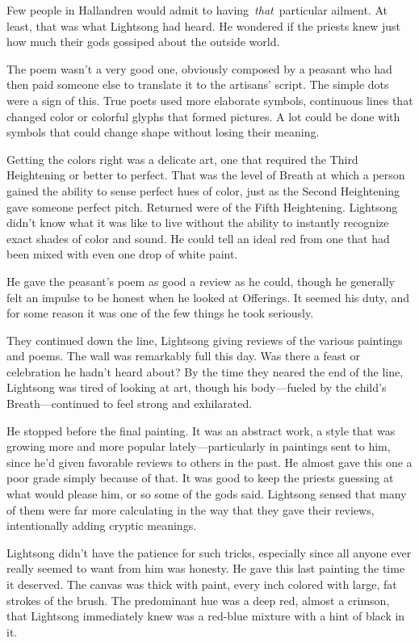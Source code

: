 Few people in Hallandren would admit to having~\textit{that}~particular ailment. At least, that was what Lightsong had heard. He wondered if the priests knew just how much their gods gossiped about the outside world.

The poem wasn’t a very good one, obviously composed by a peasant who had then paid someone else to translate it to the artisans’ script. The simple dots were a sign of this. True poets used more elaborate symbols, continuous lines that changed color or colorful glyphs that formed pictures. A lot could be done with symbols that could change shape without losing their meaning.

Getting the colors right was a delicate art, one that required the Third Heightening or better to perfect. That was the level of Breath at which a person gained the ability to sense perfect hues of color, just as the Second Heightening gave someone perfect pitch. Returned were of the Fifth Heightening. Lightsong didn’t know what it was like to live without the ability to instantly recognize exact shades of color and sound. He could tell an ideal red from one that had been mixed with even one drop of white paint.

He gave the peasant’s poem as good a review as he could, though he generally felt an impulse to be honest when he looked at Offerings. It seemed his duty, and for some reason it was one of the few things he took seriously.

They continued down the line, Lightsong giving reviews of the various paintings and poems. The wall was remarkably full this day. Was there a feast or celebration he hadn’t heard about? By the time they neared the end of the line, Lightsong was tired of looking at art, though his body—fueled by the child’s Breath—continued to feel strong and exhilarated.

He stopped before the final painting. It was an abstract work, a style that was growing more and more popular lately—particularly in paintings sent to him, since he’d given favorable reviews to others in the past. He almost gave this one a poor grade simply because of that. It was good to keep the priests guessing at what would please him, or so some of the gods said. Lightsong sensed that many of them were far more calculating in the way that they gave their reviews, intentionally adding cryptic meanings.

Lightsong didn’t have the patience for such tricks, especially since all anyone ever really seemed to want from him was honesty. He gave this last painting the time it deserved. The canvas was thick with paint, every inch colored with large, fat strokes of the brush. The predominant hue was a deep red, almost a crimson, that Lightsong immediately knew was a red-blue mixture with a hint of black in it.

